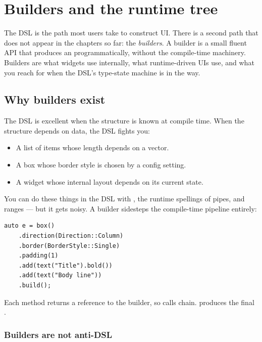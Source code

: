 \chapter{Builders and the runtime tree}
\label{ch:builders}

\begin{aside}
The DSL is the path most users take to construct UI. There is a
second path that does not appear in the chapters so far: the
\emph{builders}. A builder is a small fluent API that produces an
 programmatically, without the compile-time
machinery. Builders are what widgets use internally, what
runtime-driven UIs use, and what you reach for when the DSL's
type-state machine is in the way.
\end{aside}

\section{Why builders exist}

The DSL is excellent when the structure is known at compile
time. When the structure depends on data, the DSL fights you:

\begin{itemize}[leftmargin=*]
  \item A list of items whose length depends on a vector.
  \item A box whose border style is chosen by a config setting.
  \item A widget whose internal layout depends on its current
    state.
\end{itemize}

You can do these things in the DSL with , the runtime
spellings of pipes, and ranges --- but it gets noisy. A builder
sidesteps the compile-time pipeline entirely:

\begin{lstlisting}
auto e = box()
    .direction(Direction::Column)
    .border(BorderStyle::Single)
    .padding(1)
    .add(text("Title").bold())
    .add(text("Body line"))
    .build();
\end{lstlisting}

Each method returns a reference to the builder, so calls chain.
 produces the final .

\subsection*{Builders are not anti-DSL}

